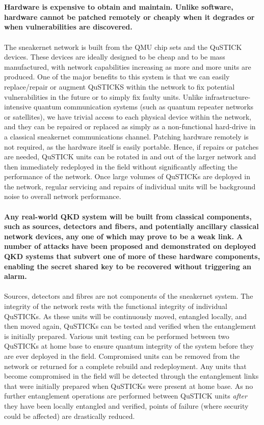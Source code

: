 \documentclass[aps,prl,twocolumn,10pt,nofootinbib]{revtex4}
\begin{document}
\\
\\
{\bf Hardware is expensive to obtain and maintain. Unlike software, hardware cannot be patched remotely or cheaply when it degrades or when vulnerabilities are discovered.}
\\
\\
The sneakernet network is built from the QMU chip sets and the QuSTICK devices.  These devices are ideally designed to be cheap and to be mass manufactured, with network capabilities increasing as more and more units are produced.  One of the major benefits to this system is that we can easily replace/repair or augment QuSTICKS within the network to fix potential vulnerabilities in the future or to simply fix faulty units.  Unlike infrastructure-intensive quantum communication systems (such as quantum repeater networks or satellites), we have trivial access to each physical device within the network, and they can be repaired or replaced as simply as a non-functional hard-drive in a classical sneakernet communications channel.  Patching hardware remotely is not required, as the hardware itself is easily portable.  Hence, if repairs or patches are needed, QuSTICK units can be rotated in and out of the larger network and then immediately redeployed in the field without significantly affecting the performance of the network.  Once large volumes of QuSTICKs are deployed in the network, regular servicing and repairs of individual units will be background noise to overall network performance.   
\\
\\
{\bf Any real-world QKD system will be built from classical components, such as sources, detectors and fibers, and potentially ancillary classical network devices, any one of which may prove to be a weak link.  A number of attacks have been proposed and demonstrated on deployed QKD systems that subvert one of more of these hardware components, enabling the secret shared key to be recovered without triggering an alarm.}
\\
\\
Sources, detectors and fibres are not components of the sneakernet system.  The integrity of the network rests with the functional integrity of individual QuSTICKs.  As these units will be continuously moved, entangled locally, and then moved again, QuSTICKs can be tested and verified when the entanglement is initially prepared.  Various unit testing can be performed between two QuSTICKs at home base to ensure quantum integrity of the system before they are ever deployed in the field.  Compromised units can be removed from the network or returned for a complete rebuild and redeployment.  Any units that become compromised in the field will be detected through the entanglement links that were initially prepared when QuSTICKs were present at home base.  As no further entanglement operations are performed between QuSTICK units {\em after} they have been locally entangled and verified, points of failure (where security could be affected) are drastically reduced. 
\end{document}
